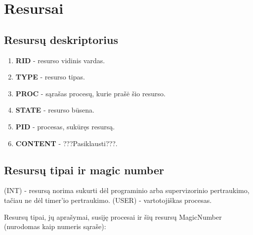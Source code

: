 \section{Resursai}
	\subsection{Resursų deskriptorius}
		\begin{enumerate}
			\item \textbf{RID} - resurso vidinis vardas.
			\item \textbf{TYPE} - resurso tipas.
			\item \textbf{PROC} - sąrašas procesų, kurie prašė šio resurso.
			\item \textbf{STATE} - resurso būsena.
			\item \textbf{PID} - procesas, sukūręs resursą.
			\item \textbf{CONTENT} - ???Pasiklausti???.
			\textbf{}
		\end{enumerate}
	\subsection{Resursų tipai ir magic number}
		
		(INT) - resursą norima sukurti dėl programinio arba supervizorinio pertraukimo, tačiau ne dėl timer'io pertraukimo.
		(USER) - vartotojiškas procesas.
		
		Resursų tipai, jų aprašymai, susiję procesai ir šių resursų MagicNumber (nurodomas kaip numeris sąraše):
		
